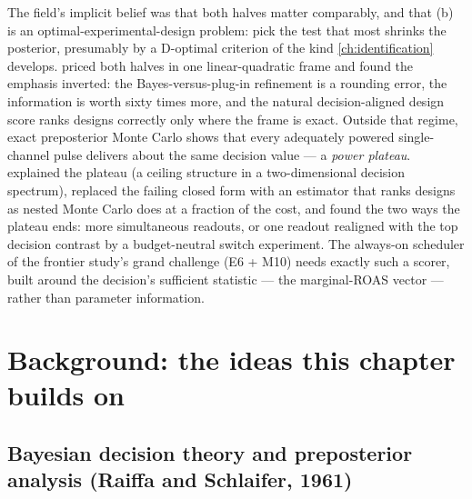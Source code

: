 The field's implicit belief was that both halves matter comparably, and that (b) is an optimal-experimental-design problem: pick the test that most shrinks the posterior, presumably by a D-optimal criterion of the kind \cref{ch:identification} develops.  priced both halves in one linear-quadratic frame and found the emphasis inverted: the Bayes-versus-plug-in refinement is a rounding error, the information is worth sixty times more, and the natural decision-aligned design score ranks designs correctly only where the frame is exact. Outside that regime, exact preposterior Monte Carlo shows that every adequately powered single-channel pulse delivers about the same decision value --- a \emph{power plateau}.  explained the plateau (a ceiling structure in a two-dimensional decision spectrum), replaced the failing closed form with an estimator that ranks designs as nested Monte Carlo does at a fraction of the cost, and found the two ways the plateau ends: more simultaneous readouts, or one readout realigned with the top decision contrast by a budget-neutral switch experiment. The always-on scheduler of the frontier study's grand challenge (E6 + M10) needs exactly such a scorer, built around the decision's sufficient statistic --- the marginal-ROAS vector --- rather than parameter information.

\section{Background: the ideas this chapter builds on}

\subsection{Bayesian decision theory and preposterior analysis (Raiffa and Schlaifer, 1961)}

